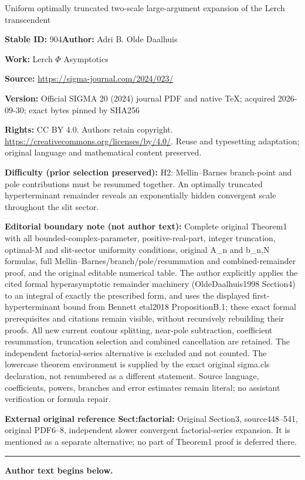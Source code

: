 \documentclass[11pt]{article}
\numberwithin{equation}{section}
\numberwithin{equation}{section}
\begin{document}
\begin{center}\Large Uniform optimally truncated two-scale large-argument expansion of the Lerch transcendent\end{center}
\noindent\textbf{Stable ID:} 904\quad\textbf{Author:} Adri B. Olde Daalhuis\par
\noindent\textbf{Work:} Lerch $\Phi$ Asymptotics\par
\noindent\textbf{Source:} \url{https://sigma-journal.com/2024/023/}\par
\noindent\textbf{Version:} Official SIGMA 20 (2024) journal PDF and native TeX; acquired 2026-09-30; exact bytes pinned by SHA256\par
\noindent\textbf{Rights:} CC BY 4.0. Authors retain copyright. \url{https://creativecommons.org/licenses/by/4.0/}. Reuse and typesetting adaptation; original language and mathematical content preserved.\par
\noindent\textbf{Difficulty (prior selection preserved):} {\CJKfont H2: Mellin–Barnes branch-point and pole contributions must be resummed together. An optimally truncated hyperterminant remainder reveals an exponentially hidden convergent scale throughout the slit sector.}\par
\medskip\noindent\textbf{Editorial boundary note (not author text):} Complete original Theorem1 with all bounded-complex-parameter, positive-real-part, integer truncation, optimal-M and slit-sector uniformity conditions, original A\_n and b\_n,N formulas, full Mellin–Barnes/branch/pole/resummation and combined-remainder proof, and the original editable numerical table. The author explicitly applies the cited formal hyperasymptotic remainder machinery (OldeDaalhuis1998 Section4) to an integral of exactly the prescribed form, and uses the displayed first-hyperterminant bound from Bennett etal2018 PropositionB.1; these exact formal prerequisites and citations remain visible, without recursively rebuilding their proofs. All new current contour splitting, near-pole subtraction, coefficient resummation, truncation selection and combined cancellation are retained. The independent factorial-series alternative is excluded and not counted. The lowercase theorem environment is supplied by the exact original sigma.cls declaration, not renumbered as a different statement. Source language, coefficients, powers, branches and error estimates remain literal; no assistant verification or formula repair.\par
\noindent\textbf{External original reference Sect:factorial:} Original Section3, source448–541, original PDF6–8, independent slower convergent factorial-series expansion. It is mentioned as a separate alternative; no part of Theorem1 proof is deferred there.\par
\medskip\hrule\medskip\noindent\textbf{Author text begins below.}\par
\end{document}
